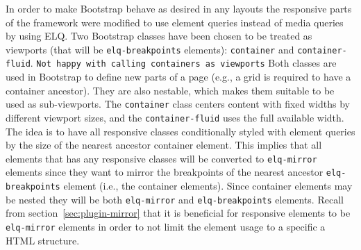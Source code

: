 \documentclass[a4paper,11pt]{kth-mag}
\newcommand{\code}[1]{\texttt{#1}}
\begin{document}
      In order to make Bootstrap behave as desired in any layouts the responsive parts of the framework were modified to use element queries instead of media queries by using \gls{ELQ}.
      Two Bootstrap classes have been chosen to be treated as viewports (that will be \code{elq-breakpoints} elements): \code{container} and \code{container-fluid}.
      \code{Not happy with calling containers as viewports}
      Both classes are used in Bootstrap to define new parts of a page (e.g., a grid is required to have a container ancestor).
      They are also nestable, which makes them suitable to be used as sub-viewports.
      The \code{container} class centers content with fixed widths by different viewport sizes, and the \code{container-fluid} uses the full available width.
      The idea is to have all responsive classes conditionally styled with element queries by the size of the nearest ancestor container element.
      This implies that all elements that has any responsive classes will be converted to \code{elq-mirror} elements since they want to mirror the breakpoints of the nearest ancestor \code{elq-breakpoints} element (i.e., the container elements).
      Since container elements may be nested they will be both \code{elq-mirror} and \code{elq-breakpoints} elements.
      Recall from section~\ref{sec:plugin-mirror} that it is beneficial for responsive elements to be \code{elq-mirror} elements in order to not limit the element usage to a specific a \gls{HTML} structure.
\end{document}
